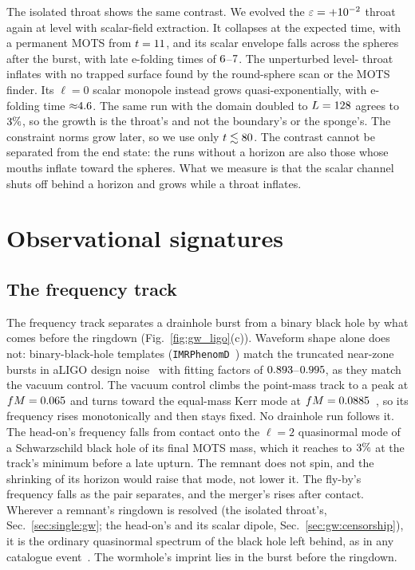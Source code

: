 \documentclass[twocolumn,floatfix,aps,prd,superscriptaddress,nofootinbib]{revtex4-2}
\begin{document}
The isolated throat shows the same contrast. We evolved the $\varepsilon=+10^{-2}$ throat again at level \clmGwKickedLevel{} with scalar-field extraction. It collapses at the expected time, with a permanent MOTS from $t=11$, and its scalar envelope falls across the spheres after the burst, with late e-folding times of $6$--$7$. The unperturbed level-\clmGwSingleLevel{} throat inflates with no trapped surface found by the round-sphere scan or the MOTS finder. Its $\ell=0$ scalar monopole instead grows quasi-exponentially, with e-folding time ${\approx}4.6$. The same run with the domain doubled to $L=128$ agrees to $3\%$, so the growth is the throat's and not the boundary's or the sponge's. The constraint norms grow later, so we use only $t\lesssim80$. The contrast cannot be separated from the end state: the runs without a horizon are also those whose mouths inflate toward the spheres. What we measure is that the scalar channel shuts off behind a horizon and grows while a throat inflates.

\section{Observational signatures}
\label{sec:ligo}

\subsection{The frequency track}
\label{sec:ligo:ringdown}

The frequency track separates a drainhole burst from a binary black hole by what comes before the ringdown (Fig.~\ref{fig:gw_ligo}(c)). Waveform shape alone does not: binary-black-hole templates (\texttt{IMRPhenomD}~\cite{husa2016,khan2016}) match the truncated near-zone bursts in aLIGO design noise~\cite{aligo2010} with fitting factors of $0.893$--$0.995$, as they match the vacuum control. The vacuum control climbs the point-mass track to a peak at $fM=0.065$ and turns toward the equal-mass Kerr mode at $fM=0.0885$~\cite{berti2006,berti2009}, so its frequency rises monotonically and then stays fixed. No drainhole run follows it. The head-on's frequency falls from contact onto the $\ell=2$ quasinormal mode of a Schwarzschild black hole of its final MOTS mass, which it reaches to $3\%$ at the track's minimum before a late upturn. The remnant does not spin, and the shrinking of its horizon would raise that mode, not lower it. The fly-by's frequency falls as the pair separates, and the merger's rises after contact. Wherever a remnant's ringdown is resolved (the isolated throat's, Sec.~\ref{sec:single:gw}; the head-on's and its scalar dipole, Sec.~\ref{sec:gw:censorship}), it is the ordinary quasinormal spectrum of the black hole left behind, as in any catalogue event~\cite{gwtc3}. The wormhole's imprint lies in the burst before the ringdown.
\end{document}
